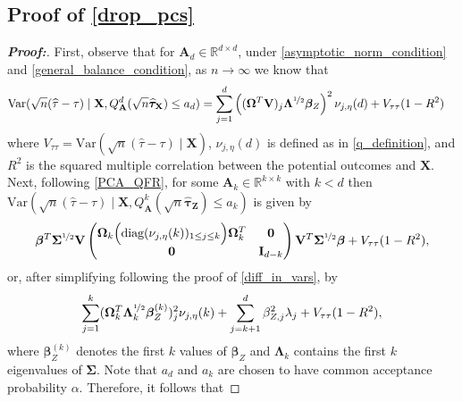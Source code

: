 \documentclass[11pt,twoside]{article}
\theoremstyle{definition}
\theoremstyle{remark}
\begin{document}
\subsection{Proof of \texorpdfstring{\cref{drop_pcs}}{Proposition 2}} \label{drop_pcs_proof}
\begin{proof}[\textbf{Proof:}]
    First, observe that for $\mathbf{A}_d \in \mathbb{R}^{d \times d}$, under \cref{asymptotic_norm_condition} and \cref{general_balance_condition}, as $n \to \infty$ we know that
    \begin{align*}
        \text{Var}(\sqrt{n}(\widehat{\tau} - \tau) \mid \mathbf{X}, Q^d_\mathbf{A}(\sqrt{n} \widehat{\bm{\tau}}_{\mathbf{X}}) \leq a_d) &= \sum^d_{j=1} \left((\mathbf{\Omega}^T   \mathbf{V})_j \mathbf{\Lambda}^{\nicefrac{1}{2}}  \bm{\beta}_Z \right)^2 \nu_{j, \eta}(d) + V_{\tau \tau}(1 - R^2)
    \end{align*}
    where $V_{\tau \tau} = \text{Var}(\sqrt{n}(\widehat{\tau} - \tau) \mid \mathbf{X})$, $\nu_{j, \eta}(d)$ is defined as in \cref{q_definition}, and $R^2$ is the squared multiple correlation between the potential outcomes and $\mathbf{X}$. Next, following \cref{PCA_QFR}, for some $\mathbf{A}_k \in \mathbb{R}^{k \times k}$ with $k < d$ then $\text{Var}(\sqrt{n}(\widehat{\tau} - \tau) \mid \mathbf{X}, Q^k_\mathbf{A}(\sqrt{n} \widehat{\bm{\tau}}_{\mathbf{Z}}) \leq a_k)$ is given by
    \begin{align*}
         \bm{\beta}^T\mathbf{\Sigma}^{\nicefrac{1}{2}} \mathbf{V}  \begin{pmatrix}
        \mathbf{\Omega}_k \Big( \text{diag}(\nu_{j, \eta}(k))_{1 \leq j \leq k} \Big) \mathbf{\Omega}^T_k   & \mathbf{0} \\
        \mathbf{0} & \mathbf{I}_{d-k}
    \end{pmatrix} \mathbf{V}^T  \mathbf{\Sigma}^{\nicefrac{1}{2}} \bm{\beta}  + V_{\tau \tau}(1 - R^2),
    \end{align*}
    or, after simplifying following the proof of \cref{diff_in_vars}, by
    \begin{align*}
         \sum^k_{j=1}(\mathbf{\Omega}^T_k \mathbf{\Lambda}^{\nicefrac{1}{2}}_k \bm{\beta}^{(k)}_Z)^2_j \nu_{j, \eta}(k) + \sum^d_{j = k+1} \beta^2_{Z,j} \lambda_j  + V_{\tau \tau}(1 - R^2),
    \end{align*}
    where $\bm{\beta}^{(k)}_Z$ denotes the first $k$ values of $\bm{\beta}_Z$ and $\mathbf{\Lambda}_k$ contains the first $k$ eigenvalues of $\mathbf{\Sigma}$. Note that $a_d$ and $a_k$ are chosen to have common acceptance probability $\alpha$. Therefore, it follows that

\end{proof}
\end{document}
